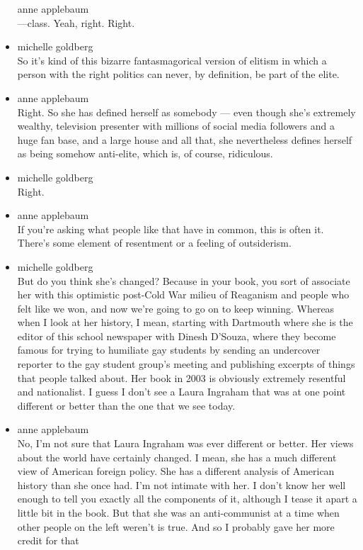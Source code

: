 \begin{itemize}
  anne applebaum\\
  ---class. Yeah, right. Right.
\item
  michelle goldberg\\
  So it's kind of this bizarre fantasmagorical version of elitism in
  which a person with the right politics can never, by definition, be
  part of the elite.
\item
  anne applebaum\\
  Right. So she has defined herself as somebody --- even though she's
  extremely wealthy, television presenter with millions of social media
  followers and a huge fan base, and a large house and all that, she
  nevertheless defines herself as being somehow anti-elite, which is, of
  course, ridiculous.
\item
  michelle goldberg\\
  Right.
\item
  anne applebaum\\
  If you're asking what people like that have in common, this is often
  it. There's some element of resentment or a feeling of outsiderism.
\item
  michelle goldberg\\
  But do you think she's changed? Because in your book, you sort of
  associate her with this optimistic post-Cold War milieu of Reaganism
  and people who felt like we won, and now we're going to go on to keep
  winning. Whereas when I look at her history, I mean, starting with
  Dartmouth where she is the editor of this school newspaper with Dinesh
  D'Souza, where they become famous for trying to humiliate gay students
  by sending an undercover reporter to the gay student group's meeting
  and publishing excerpts of things that people talked about. Her book
  in 2003 is obviously extremely resentful and nationalist. I guess I
  don't see a Laura Ingraham that was at one point different or better
  than the one that we see today.
\item
  anne applebaum\\
  No, I'm not sure that Laura Ingraham was ever different or better. Her
  views about the world have certainly changed. I mean, she has a much
  different view of American foreign policy. She has a different
  analysis of American history than she once had. I'm not intimate with
  her. I don't know her well enough to tell you exactly all the
  components of it, although I tease it apart a little bit in the book.
  But that she was an anti-communist at a time when other people on the
  left weren't is true. And so I probably gave her more credit for that

\end{itemize}
